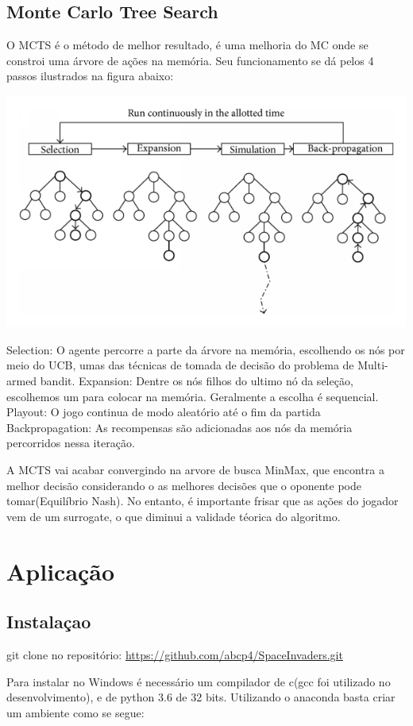 \documentclass[]{book}
\begin{document}
\section{Monte Carlo Tree Search}\label{monte-carlo-tree-search}

O MCTS \citep{browne2012survey} é o método de melhor resultado, é uma
melhoria do MC onde se constroi uma árvore de ações na memória. Seu
funcionamento se dá pelos 4 passos ilustrados na figura abaixo:

\begin{center}\includegraphics[width=0.5\linewidth]{content/imgs/MCTS} \end{center}

Selection: O agente percorre a parte da árvore na memória, escolhendo os
nós por meio do UCB, umas das técnicas de tomada de decisão do problema
de Multi-armed bandit. Expansion: Dentre os nós filhos do ultimo nó da
seleção, escolhemos um para colocar na memória. Geralmente a escolha é
sequencial. Playout: O jogo continua de modo aleatório até o fim da
partida Backpropagation: As recompensas são adicionadas aos nós da
memória percorridos nessa iteração.

A MCTS vai acabar convergindo na arvore de busca MinMax, que encontra a
melhor decisão considerando o as melhores decisões que o oponente pode
tomar(Equilíbrio Nash). No entanto, é importante frisar que as ações do
jogador vem de um surrogate, o que diminui a validade téorica do
algoritmo.

\chapter{Aplicação}\label{app}

\section{Instalaçao}\label{instalauxe7ao}

git clone no repositório:
\url{https://github.com/abcp4/SpaceInvaders.git}

Para instalar no Windows é necessário um compilador de c(gcc foi
utilizado no desenvolvimento), e de python 3.6 de 32 bits. Utilizando o
anaconda basta criar um ambiente como se segue:
\end{document}
